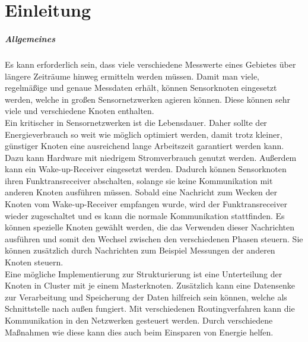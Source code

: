 \chapter{Einleitung}

\paragraph{Allgemeines}
Es kann erforderlich sein, dass viele verschiedene Messwerte eines Gebietes über längere Zeiträume hinweg ermitteln werden müssen. Damit man viele, regelmäßige und genaue Messdaten erhält, können Sensorknoten eingesetzt werden, welche in großen Sensornetzwerken agieren können. Diese können sehr viele und verschiedene Knoten enthalten.\\
Ein kritischer in Sensornetzwerken ist die Lebensdauer. Daher sollte der Energieverbrauch so weit wie möglich optimiert werden, damit trotz kleiner, günstiger Knoten eine ausreichend lange Arbeitszeit garantiert werden kann. Dazu kann Hardware mit niedrigem Stromverbrauch genutzt werden. Außerdem kann ein Wake-up-Receiver eingesetzt werden. Dadurch können Sensorknoten ihren Funktransreceiver abschalten, solange sie keine Kommunikation mit anderen Knoten ausführen müssen. Sobald eine Nachricht zum Wecken der Knoten vom Wake-up-Receiver empfangen wurde, wird der Funktransreceiver wieder zugeschaltet und es kann die normale Kommunikation stattfinden. Es können spezielle Knoten gewählt werden, die das Verwenden dieser Nachrichten ausführen und somit den Wechsel zwischen den verschiedenen Phasen steuern. Sie können zusätzlich durch Nachrichten zum Beispiel Messungen der anderen Knoten steuern.\\
Eine mögliche Implementierung zur Strukturierung ist eine Unterteilung der Knoten in Cluster mit je einem Masterknoten. Zusätzlich kann eine Datensenke zur Verarbeitung und Speicherung der Daten hilfreich sein können, welche als Schnittstelle nach außen fungiert. Mit verschiedenen Routingverfahren kann die Kommunikation in den Netzwerken gesteuert werden. Durch verschiedene Maßnahmen wie diese kann dies auch beim Einsparen von Energie helfen.\\
\\
